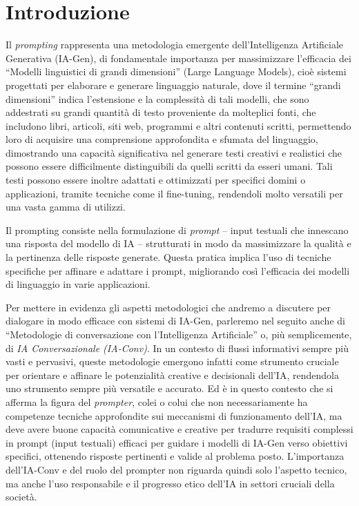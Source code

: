 \section{Introduzione}
    Il \textit{prompting} rappresenta una metodologia emergente dell'Intelligenza Artificiale Generativa (IA-Gen), di fondamentale importanza per massimizzare l'efficacia dei ``Modelli linguistici di grandi dimensioni'' (Large Language Models), cioè sistemi progettati per elaborare e generare linguaggio naturale, dove il termine “grandi dimensioni” indica l'estensione e la complessità di tali modelli, che sono addestrati su grandi quantità di testo proveniente da molteplici fonti, che includono libri, articoli, siti web, programmi e altri contenuti scritti, permettendo loro di acquisire una comprensione approfondita e sfumata del linguaggio, dimostrando una capacità significativa nel generare testi creativi e realistici che possono essere difficilmente distinguibili da quelli scritti da esseri umani. Tali testi possono essere inoltre adattati e ottimizzati per specifici domini o applicazioni, tramite tecniche come il fine-tuning, rendendoli molto versatili per una vasta gamma di utilizzi.

    Il prompting consiste nella formulazione di \textit{prompt} -- input testuali che innescano una risposta del modello di IA -- strutturati in modo da massimizzare la qualità e la pertinenza delle risposte generate. Questa pratica implica l'uso di tecniche specifiche per affinare e adattare i prompt, migliorando così l'efficacia dei modelli di linguaggio in varie applicazioni.

    Per mettere in evidenza gli aspetti metodologici che andremo a discutere per dialogare in modo efficace con sistemi di IA-Gen, parleremo nel seguito anche di ``Metodologie di conversazione con l'Intelligenza Artificiale'' o, più semplicemente, di \textit{IA Conversazionale (IA-Conv)}. In un contesto di flussi informativi sempre più vasti e pervasivi, queste metodologie emergono infatti come strumento cruciale per orientare e affinare le potenzialità creative e decisionali dell'IA, rendendola uno strumento sempre più versatile e accurato. Ed è in questo contesto che si afferma la figura del \textit{prompter}, colei o colui che non necessariamente ha competenze tecniche approfondite sui meccanismi di funzionamento dell'IA, ma deve avere buone capacità comunicative e creative per tradurre requisiti complessi in prompt (input testuali) efficaci per guidare i modelli di IA-Gen verso obiettivi specifici, ottenendo risposte pertinenti e valide al problema posto. L'importanza dell'IA-Conv e del ruolo del prompter non riguarda quindi solo l'aspetto tecnico, ma anche l'uso responsabile e il progresso etico dell'IA in settori cruciali della società.

